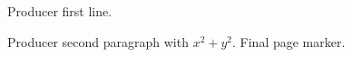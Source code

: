 \documentclass{article}
\begin{document}
Producer first line.
\par Producer second paragraph with $x^2+y^2$.
\newpage
Final page marker.
\end{document}
